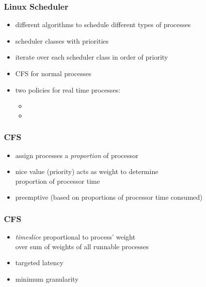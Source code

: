\documentclass[dvipsnames]{beamer}
\begin{document}
\begin{frame}
  \frametitle{Linux Scheduler}

  \begin{itemize}
    \item different algorithms to schedule different types of processes
    \item scheduler classes with priorities
    \item iterate over each scheduler class in order of priority
    \item CFS for normal processes
    \item two policies for real time processes:
    \begin{itemize}
      \item {}
      \item {}
    \end{itemize}
  \end{itemize}
\end{frame}

\begin{frame}
  \frametitle{CFS}

  \begin{itemize}
    \item assign processes a \emph{proportion} of processor
    \item nice value (priority) acts as weight to determine\\
      proportion of processor time
    \item preemptive (based on proportions of processor time consumed)
  \end{itemize}
\end{frame}

\begin{frame}
  \frametitle{CFS}

  \begin{itemize}
    \item \emph{timeslice} proportional to process' weight\\
      over sum of weights of all runnable processes
    \item targeted latency
    \item minimum granularity
  \end{itemize}
\end{frame}
\end{document}
